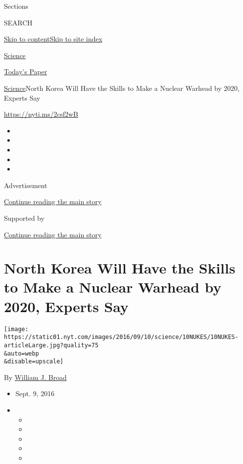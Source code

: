 Sections

SEARCH

\protect\hyperlink{site-content}{Skip to
content}\protect\hyperlink{site-index}{Skip to site index}

\href{https://www.nytimes.com/section/science}{Science}

\href{https://myaccount.nytimes.com/auth/login?response_type=cookie\&client_id=vi}{}

\href{https://www.nytimes.com/section/todayspaper}{Today's Paper}

\href{/section/science}{Science}\textbar{}North Korea Will Have the
Skills to Make a Nuclear Warhead by 2020, Experts Say

\url{https://nyti.ms/2csf2wB}

\begin{itemize}
\item
\item
\item
\item
\item
\end{itemize}

Advertisement

\protect\hyperlink{after-top}{Continue reading the main story}

Supported by

\protect\hyperlink{after-sponsor}{Continue reading the main story}

\hypertarget{north-korea-will-have-the-skills-to-make-a-nuclear-warhead-by-2020-experts-say}{%
\section{North Korea Will Have the Skills to Make a Nuclear Warhead by
2020, Experts
Say}\label{north-korea-will-have-the-skills-to-make-a-nuclear-warhead-by-2020-experts-say}}

\texttt{[image: https://static01.nyt.com/images/2016/09/10/science/10NUKES/10NUKES-articleLarge.jpg?quality=75\\\&auto=webp\\\&disable=upscale]}

By \href{http://www.nytimes.com/by/william-j-broad}{William J. Broad}

\begin{itemize}
\item
  Sept. 9, 2016
\item
  \begin{itemize}
  \item
  \item
  \item
  \item
  \item
  \end{itemize}
\end{itemize}

